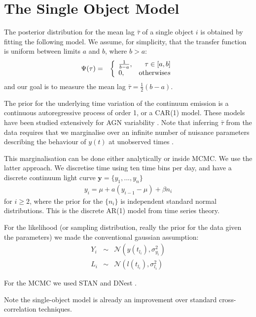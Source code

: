 \documentclass[useAMS,usenatbib]{mn2e}
\begin{document}
\section{The Single Object Model}
The posterior distribution for the mean lag $\bar{\tau}$ of a single object
$i$ is obtained
by fitting the following model. We assume, for simplicity, that
the transfer function is uniform
between limits $a$ and $b$, where $b > a$:
\begin{eqnarray}
\Psi(\tau) &=& \left\{
\begin{array}{lr}
\frac{1}{b-a}, & \tau \in [a,b]\\
0, & \textnormal{otherwise}s
\end{array}\right.
\end{eqnarray}
and our goal is to measure the mean lag $\bar{\tau} = \frac{1}{2}(b-a)$.

The prior for the underlying time variation of the continuum emission is
a continuous autoregressive process of order 1, or a CAR(1) model. These models
have been studied extensively for AGN variability
\citep[e.g.][]{2009ApJ...698..895K, 2011ApJ...735...80Z, 2013ApJ...765..106Z}.
Note that inferring $\bar{\tau}$ from the data requires that we
marginalise over an infinite number of nuisance parameters describing the
behaviour of $y(t)$ at unobserved times \citep{pancoast}.

This marginalisation can be done
either analytically or inside MCMC. We use the latter approach. We discretise
time using ten time bins per day, and have a discrete continuum light curve
$\mathbf{y} = \{y_1, ..., y_n\}$
\begin{eqnarray}
y_i = \mu + a\left(y_{i-1} - \mu\right) + \beta n_i
\end{eqnarray}
for $i \geq 2$, where the prior for the $\{n_i\}$ is independent standard
normal distributions. This is the discrete AR(1) model from time series theory.

For the likelihood (or sampling distribution, really the prior for the data
given the parameters) we made the conventional gaussian assumption:
\begin{eqnarray}
Y_i &\sim& \mathcal{N}\left(y(t_{l_i}), \sigma_{y_i}^2\right)\\
L_i &\sim& \mathcal{N}\left(l(t_{l_i}), \sigma_{l_i}^2\right)
\end{eqnarray}

For the MCMC we used STAN \citep{nuts} and DNest \citep{dnest}.


Note the single-object model is already an improvement over standard
cross-correlation techniques.
\end{document}
